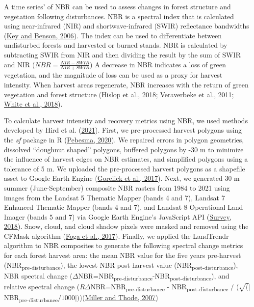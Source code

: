 \documentclass[
  12pt,
]{article}
\begin{document}
A time series' of NBR can be used to assess changes in forest structure and vegetation following disturbances. NBR is a spectral index that is calculated using near-infrared (NIR) and shortwave-infrared (SWIR) reflectance bandwidths (\protect\hyperlink{ref-keyLandscapeAssessmentGround2006}{Key and Benson, 2006}). The index can be used to differentiate between undisturbed forests and harvested or burned stands. NBR is calculated by subtracting SWIR from NIR and then dividing the result by the sum of SWIR and NIR (\(NBR=\frac{NIR-SWIR}{NIR+SWIR}\))
A decrease in NBR indicates a loss of green vegetation, and the magnitude of loss can be used as a proxy for harvest intensity. When harvest areas regenerate, NBR increases with the return of green vegetation and forest structure (\protect\hyperlink{ref-hislopUsingLandsatSpectral2018}{Hislop et al., 2018}; \protect\hyperlink{ref-veraverbekeEvaluatingSpectralIndices2011}{Veraverbeke et al., 2011}; \protect\hyperlink{ref-whiteConfirmationPostharvestSpectral2018}{White et al., 2018}).

To calculate harvest intensity and recovery metrics using NBR, we used methods developed by Hird et al. (\protect\hyperlink{ref-hirdSatelliteTimeSeries2021}{2021}). First, we pre-processed harvest polygons using the \emph{sf} package in R (\protect\hyperlink{ref-R-sf}{Pebesma, 2020}). We repaired errors in polygon geometries, dissolved ``doughnut shaped'' polygons, buffered polygons by -30 m to minimize the influence of harvest edges on NBR estimates, and simplified polygons using a tolerance of 5 m. We uploaded the pre-processed harvest polygons as a shapefile asset to Google Earth Engine (\protect\hyperlink{ref-gorelickGoogleEarthEngine2017}{Gorelick et al., 2017}). Next, we generated 30 m summer (June-September) composite NBR rasters from 1984 to 2021 using images from the Landsat 5 Thematic Mapper (bands 4 and 7), Landsat 7 Enhanced Thematic Mapper (bands 4 and 7), and Landsat 8 Operational Land Imager (bands 5 and 7) via Google Earth Engine's JavaScript API (\protect\hyperlink{ref-geologicalsurveyLandsat47Surface2018}{Survey, 2018}). Snow, cloud, and cloud shadow pixels were masked and removed using the CFMask algorithm (\protect\hyperlink{ref-fogaCloudDetectionAlgorithm2017}{Foga et al., 2017}). Finally, we applied the LandTrendr algorithm to NBR composites to generate the following spectral change metrics for each forest harvest area: the mean NBR value for the five years pre-harvest (NBR\textsubscript{pre-disturbance}), the lowest NBR post-harvest value (NBR\textsubscript{post-disturbance}), NBR spectral change (\(\Delta\)NBR=NBR\textsubscript{pre-disturbance}-NBR\textsubscript{post-disturbance}), and relative spectral change (\(R\Delta\)NBR=NBR\textsubscript{pre-disturbance} - NBR\textsubscript{post-disturbance} / (\(\sqrt(|\)NBR\textsubscript{pre-disturbance}\(/1000|)\))(\protect\hyperlink{ref-MillerThode2007}{Miller and Thode, 2007})
\end{document}
